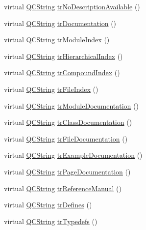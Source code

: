\begin{DoxyCompactItemize}
\item 
virtual \hyperlink{class_q_c_string}{Q\+C\+String} \hyperlink{class_translator_arabic_a533c780424da89c73dbd2b44da8e61e0}{tr\+No\+Description\+Available} ()
\item 
virtual \hyperlink{class_q_c_string}{Q\+C\+String} \hyperlink{class_translator_arabic_a1b58fe62b474d91b2128db010ebc973d}{tr\+Documentation} ()
\item 
virtual \hyperlink{class_q_c_string}{Q\+C\+String} \hyperlink{class_translator_arabic_a763aedc374d5a545644b448871ddd6c1}{tr\+Module\+Index} ()
\item 
virtual \hyperlink{class_q_c_string}{Q\+C\+String} \hyperlink{class_translator_arabic_a7da261a6bc8035969e40c01fe4ea85d7}{tr\+Hierarchical\+Index} ()
\item 
virtual \hyperlink{class_q_c_string}{Q\+C\+String} \hyperlink{class_translator_arabic_ab554e3f789d9189e6fc94f00a1746983}{tr\+Compound\+Index} ()
\item 
virtual \hyperlink{class_q_c_string}{Q\+C\+String} \hyperlink{class_translator_arabic_a9679911e97d493f2c83d0de23f623922}{tr\+File\+Index} ()
\item 
virtual \hyperlink{class_q_c_string}{Q\+C\+String} \hyperlink{class_translator_arabic_a2d1938484e265a2ca1c0d73fd9f750cf}{tr\+Module\+Documentation} ()
\item 
virtual \hyperlink{class_q_c_string}{Q\+C\+String} \hyperlink{class_translator_arabic_a169f9b2baaf46468d775d1934f4a8043}{tr\+Class\+Documentation} ()
\item 
virtual \hyperlink{class_q_c_string}{Q\+C\+String} \hyperlink{class_translator_arabic_a8570fc7161fa78fa6304be53346908cb}{tr\+File\+Documentation} ()
\item 
virtual \hyperlink{class_q_c_string}{Q\+C\+String} \hyperlink{class_translator_arabic_afcb9a17ca0cf3e9a30bc8fcaa3eb0529}{tr\+Example\+Documentation} ()
\item 
virtual \hyperlink{class_q_c_string}{Q\+C\+String} \hyperlink{class_translator_arabic_a074729639b28138464929fa6232672bf}{tr\+Page\+Documentation} ()
\item 
virtual \hyperlink{class_q_c_string}{Q\+C\+String} \hyperlink{class_translator_arabic_a7ced5f4c01b62f92c8bca76004b75a11}{tr\+Reference\+Manual} ()
\item 
virtual \hyperlink{class_q_c_string}{Q\+C\+String} \hyperlink{class_translator_arabic_a94a8e0d1f335193616003f21b5a68c20}{tr\+Defines} ()
\item 
virtual \hyperlink{class_q_c_string}{Q\+C\+String} \hyperlink{class_translator_arabic_a30fbc478e83497bb46e33374a3407b64}{tr\+Typedefs} ()

\end{DoxyCompactItemize}
